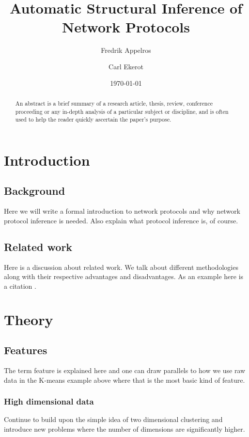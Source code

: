 \documentclass[a4paper]{report}
\begin{document}
\title{Automatic Structural Inference of Network Protocols}
\author{Fredrik Appelros \and Carl Ekerot}
\date{\today}
\maketitle

\begin{abstract}
An abstract is a brief summary of a research article, thesis, review,
conference proceeding or any in-depth analysis of a particular subject or
discipline, and is often used to help the reader quickly ascertain the paper's
purpose.
\end{abstract}

\tableofcontents

\chapter{Introduction}

\section{Background}
Here we will write a formal introduction to network protocols and why network
protocol inference is needed. Also explain what protocol inference is, of
course.

\section{Related work}
Here is a discussion about related work. We talk about different methodologies
along with their respective advantages and disadvantages. As an example here
is a citation \cite{cui07}.

\chapter{Theory}

\section{Features}
The term feature is explained here and one can draw parallels to how we use
raw data in the K-means example above where that is the most basic kind of
feature.

\subsection{High dimensional data}
Continue to build upon the simple idea of two dimensional clustering and
introduce new problems where the number of dimensions are significantly
higher.
\end{document}
